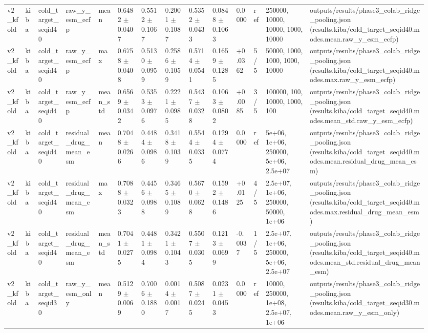 \begin{table}[htbp]
\begin{tabular}{llllllllllllll}
v2\_kfold & kiba & cold\_target\_seqid40 & raw\_y\_esm\_ecfp & mean & 0.6482 $\pm$ 0.0407 & 0.5512 $\pm$ 0.1067 & 0.2001 $\pm$ 0.1087 & 0.5352 $\pm$ 0.0433 & 0.0848 $\pm$ 0.1063 & 0.0000 & ref & 250000, 10000, 10000, 1000, 10000 & outputs/results/phase3\_colab\_ridge\_pooling.json (results.kiba/cold\_target\_seqid40.modes.mean.raw\_y\_esm\_ecfp) \\
v2\_kfold & kiba & cold\_target\_seqid40 & raw\_y\_esm\_ecfp & max & 0.6758 $\pm$ 0.0408 & 0.5130 $\pm$ 0.0959 & 0.2586 $\pm$ 0.1059 & 0.5714 $\pm$ 0.0541 & 0.1659 $\pm$ 0.1285 & +0.0362 & 5/5 & 50000, 1000, 1000, 1000, 10000 & outputs/results/phase3\_colab\_ridge\_pooling.json (results.kiba/cold\_target\_seqid40.modes.max.raw\_y\_esm\_ecfp) \\
v2\_kfold & kiba & cold\_target\_seqid40 & raw\_y\_esm\_ecfp & mean\_std & 0.6569 $\pm$ 0.0342 & 0.5353 $\pm$ 0.0976 & 0.2221 $\pm$ 0.0985 & 0.5437 $\pm$ 0.0328 & 0.1063 $\pm$ 0.0802 & +0.0085 & 3/5 & 100000, 100, 10000, 1000, 100 & outputs/results/phase3\_colab\_ridge\_pooling.json (results.kiba/cold\_target\_seqid40.modes.mean\_std.raw\_y\_esm\_ecfp) \\
v2\_kfold & kiba & cold\_target\_seqid40 & residual\_drug\_mean\_esm & mean & 0.7048 $\pm$ 0.0266 & 0.4484 $\pm$ 0.0986 & 0.3418 $\pm$ 0.1039 & 0.5544 $\pm$ 0.0335 & 0.1294 $\pm$ 0.0774 & 0.0000 & ref & 5e+06, 1e+06, 250000, 5e+06, 2.5e+07 & outputs/results/phase3\_colab\_ridge\_pooling.json (results.kiba/cold\_target\_seqid40.modes.mean.residual\_drug\_mean\_esm) \\
v2\_kfold & kiba & cold\_target\_seqid40 & residual\_drug\_mean\_esm & max & 0.7088 $\pm$ 0.0323 & 0.4456 $\pm$ 0.0988 & 0.3465 $\pm$ 0.1089 & 0.5670 $\pm$ 0.0628 & 0.1592 $\pm$ 0.1486 & +0.0125 & 4/5 & 2.5e+07, 1e+06, 250000, 50000, 1e+06 & outputs/results/phase3\_colab\_ridge\_pooling.json (results.kiba/cold\_target\_seqid40.modes.max.residual\_drug\_mean\_esm) \\
v2\_kfold & kiba & cold\_target\_seqid40 & residual\_drug\_mean\_esm & mean\_std & 0.7041 $\pm$ 0.0275 & 0.4481 $\pm$ 0.0984 & 0.3421 $\pm$ 0.1043 & 0.5507 $\pm$ 0.0305 & 0.1213 $\pm$ 0.0699 & -0.0037 & 1/5 & 2.5e+07, 1e+06, 250000, 5e+06, 2.5e+07 & outputs/results/phase3\_colab\_ridge\_pooling.json (results.kiba/cold\_target\_seqid40.modes.mean\_std.residual\_drug\_mean\_esm) \\
v2\_kfold & kiba & cold\_target\_seqid30 & raw\_y\_esm\_only & mean & 0.5129 $\pm$ 0.0069 & 0.7006 $\pm$ 0.1880 & 0.0014 $\pm$ 0.0017 & 0.5087 $\pm$ 0.0245 & 0.0231 $\pm$ 0.0453 & 0.0000 & ref & 10000, 250000, 1e+08, 2.5e+07, 1e+06 & outputs/results/phase3\_colab\_ridge\_pooling.json (results.kiba/cold\_target\_seqid30.modes.mean.raw\_y\_esm\_only) \\

\end{tabular}
\end{table}
